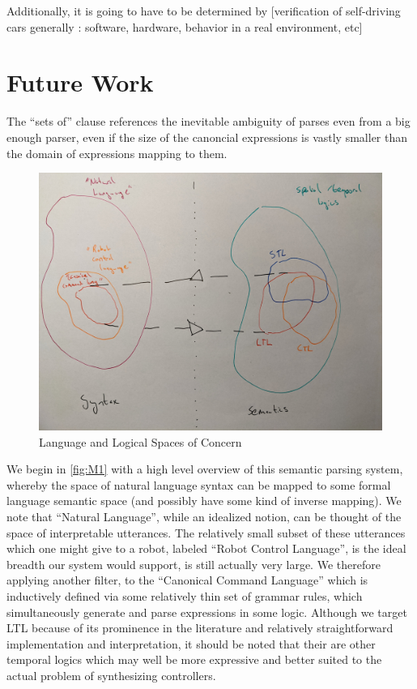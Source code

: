 \documentclass[a4paper, 11pt]{article}
\begin{document}
Additionally, it is going to have to be determined by 
[verification of self-driving cars generally : software, hardware, behavior in
a real environment, etc]



\section{Future Work}

The ``sets of'' clause
references the inevitable ambiguity of parses even from a big enough parser, even
if the size of the canoncial expressions is vastly smaller than the domain of
expressions mapping to them.

\begin{figure}[H]
\centering
\includegraphics[width=150mm]{pics/one.jpg}
\caption{Language and Logical Spaces of Concern} \label{fig:M1}
\end{figure}

We begin in \autoref{fig:M1} with a high level overview of this semantic parsing
system, whereby the space of natural language syntax can be mapped to some
formal language semantic space (and possibly have some kind of inverse mapping).
We note that ``Natural Language'', while an idealized notion, can be thought of
the space of interpretable utterances. The relatively small subset of these
utterances which one might give to a robot, labeled ``Robot Control Language'',
is the ideal breadth our system would support, is still actually very large. We
therefore applying another filter, to the ``Canonical Command Language'' which
is inductively defined via some relatively thin set of grammar rules, which
simultaneously generate and parse expressions in some logic. Although we target
LTL because of its prominence in the literature and relatively straightforward
implementation and interpretation, it should be noted that their are other
temporal logics which may well be more expressive and better suited to the
actual problem of synthesizing controllers.
\end{document}
